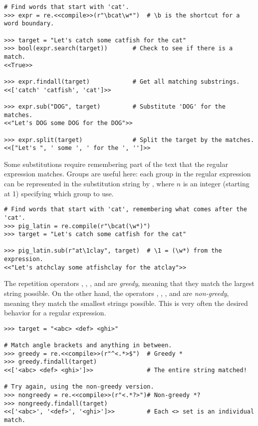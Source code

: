 \begin{lstlisting}
# Find words that start with 'cat'.
>>> expr = re.<<compile>>(r"\bcat\w*")  # \b is the shortcut for a word boundary.

>>> target = "Let's catch some catfish for the cat"
>>> bool(expr.search(target))       # Check to see if there is a match.
<<True>>

>>> expr.findall(target)            # Get all matching substrings.
<<['catch' 'catfish', 'cat']>>

>>> expr.sub("DOG", target)         # Substitute 'DOG' for the matches.
<<"Let's DOG some DOG for the DOG">>

>>> expr.split(target)              # Split the target by the matches.
<<["Let's ", ' some ', ' for the ', '']>>
\end{lstlisting}

Some substitutions require remembering part of the text that the regular expression matches.
Groups are useful here: each group in the regular expression can be represented in the substitution string by \li{\\n}, where $n$ is an integer (starting at 1) specifying which group to use.

\begin{lstlisting}
# Find words that start with 'cat', remembering what comes after the 'cat'.
>>> pig_latin = re.compile(r"\bcat(\w*)")
>>> target = "Let's catch some catfish for the cat"

>>> pig_latin.sub(r"at\1clay", target)  # \1 = (\w*) from the expression.
<<"Let's atchclay some atfishclay for the atclay">>
\end{lstlisting}

\begin{info} %
The repetition operators , \li{+}, \li{*}, and  are \emph{greedy}, meaning that they match the largest string possible.
On the other hand, the operators , , , and  are \emph{non-greedy}, meaning they match the smallest strings possible.
This is very often the desired behavior for a regular expression.

\begin{lstlisting}
>>> target = "<abc> <def> <ghi>"

# Match angle brackets and anything in between.
>>> greedy = re.<<compile>>(r"^<.*>$")  # Greedy *
>>> greedy.findall(target)
<<['<abc> <def> <ghi>']>>               # The entire string matched!

# Try again, using the non-greedy version.
>>> nongreedy = re.<<compile>>(r"<.*?>")# Non-greedy *?
>>> nongreedy.findall(target)
<<['<abc>', '<def>', '<ghi>']>>         # Each <> set is an individual match.
\end{lstlisting}
\end{info}

